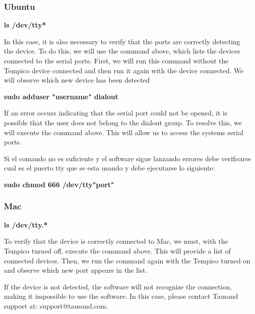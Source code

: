\documentclass[
]{article}
\begin{document}
\hypertarget{ubuntu-1}{%
\subsubsection{Ubuntu}\label{ubuntu-1}}
\begin{center}
    \textbf{ls /dev/tty*}
\end{center}

In this case, it is also necessary to verify that the ports are
correctly detecting the device. To do this, we will use the command
above, which lists the devices connected to the serial ports. First, we
will run this command without the Tempico device connected and then run
it again with the device connected. We will observe which new device has
been detected

\begin{center}
    \textbf{sudo adduser "username" dialout}
\end{center}


If an error occurs indicating that the serial port could not be opened,
it is possible that the user does not belong to the dialout group. To
resolve this, we will execute the command above. This will allow us to
access the system\textquotesingle s serial ports.

Si el comando no es suficiente y el software sigue lanzando errores debe
verificarse cual es el puerto tty que se esta usando y debe ejecutarse
lo siguiente:

\begin{center}
    \textbf{sudo chmod 666 /dev/tty"port"}
\end{center}

\hypertarget{mac-1}{%
\subsubsection{Mac}\label{mac-1}}

\begin{center}
    \textbf{ls /dev/tty.*}
\end{center}


To verify that the device is correctly connected to Mac, we must, with
the Tempico turned off, execute the command above. This will provide a
list of connected devices. Then, we run the command again with the
Tempico turned on and observe which new port appears in the list.

If the device is not detected, the software will not recognize the
connection, making it impossible to use the software. In this case,
please contact Tausand support at: support@tausand.com.
\end{document}
